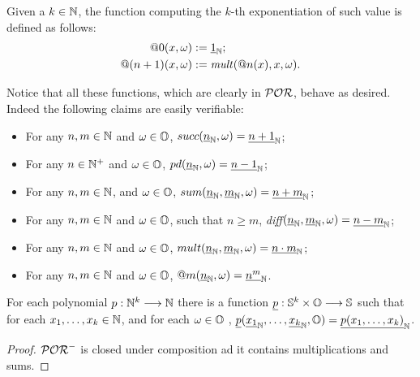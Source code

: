 \begin{defn}[Exponentiation]
Given a $k\in \mathbb{N}$, the function computing
the $k$-th exponentiation of such value
is defined as follows:
\begin{align*}
  @0(x, \omega)&:= {\underline{1}}_{\mathbb{N}};\\
  @(n+1)(x, \omega)&:= \mathit{mult}(@n(x), x, \omega).
\end{align*}
\end{defn}

Notice that all these functions, which are clearly in $\mathcal{POR}$,
behave as desired. Indeed the following claims are
easily verifiable:
\begin{itemize}
\itemsep0em
\item For any $n,m\in \mathbb{N}$ and $\omega\in \mathbb{O}$,
$succ(\underline{n}_{\mathbb{N}},\omega)=\underline{n+1}_{\mathbb{N}}$;

 \item {For any $n\in \mathbb{N}^+$ and $\omega\in \mathbb{O}$,
 $pd(\underline{n}_{\mathbb{N}},\omega)=\underline{n-1}_{\mathbb{N}}$};

 \item For any $n,m\in \mathbb{N}$, and $\omega\in \mathbb{O}$, $sum(\underline{n}_{\mathbb{N}},
 \underline{m}_{\mathbb{N}}, \omega)=\underline{n+m}_{\mathbb{N}}$;

\item For any $n,m\in \mathbb{N}$ and $\omega\in \mathbb{O}$, such that $n\ge m$,
\emph{diff}$(\underline{n}_{\mathbb{N}}, \underline{m}_{\mathbb{N}}, \omega)=
\underline{n-m}_{\mathbb{N}}$;

\item For any $n,m\in \mathbb{N}$ and $\omega\in \mathbb{O}$, $mult(\underline{n}_{\mathbb{N}}, \underline{m}_{\mathbb{N}}, \omega) = \underline{n\cdot m}_{\mathbb{N}}$;

\item For any $n,m \in \mathbb{N}$ and $\omega\in \mathbb{O}$, $@m(\underline{n}_{\mathbb{N}}, \omega)=
\underline{n^m}_{\mathbb{N}}$.
\end{itemize}

\begin{cor}
  \label{cor:polyinpor}
  For each polynomial $p: \mathbb{N}^k\longrightarrow \mathbb{N}$ there is a function
  $\underline p: \mathbb{S}^k\times \mathbb{O} \longrightarrow \mathbb{S}$ such that for each
  $x_1, \ldots, x_k \in \mathbb{N}$, and for each $\omega \in \mathbb{O}$ ,
  $\underline p({\underline{x_1}}_{\mathbb{N}}, \ldots, {\underline{x_k}}_{\mathbb{N}}, \mathbb{O})=
  {\underline{p(x_1, \ldots, x_k)}}_{\mathbb{N}}$.
\end{cor}
\begin{proof}
  $\mathcal{POR}^-$ is closed under composition ad it contains multiplications and sums.
\end{proof}


